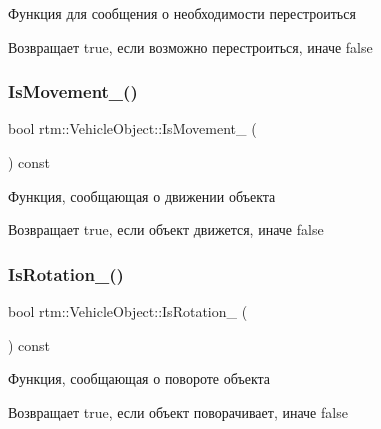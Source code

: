 Функция для сообщения о необходимости перестроиться 

\begin{DoxyReturn}{Возвращает}
true, если возможно перестроиться, иначе false 
\end{DoxyReturn}
\mbox{\label{classrtm_1_1_vehicle_object_adcccb796e4b1b404a25512fa8491cd43}} 
\subsubsection{\texorpdfstring{Is\+Movement\+\_\+()}{IsMovement\_()}}
{\footnotesize\ttfamily bool rtm\+::\+Vehicle\+Object\+::\+Is\+Movement\+\_\+ (\begin{DoxyParamCaption}{ }\end{DoxyParamCaption}) const\hspace{0.3cm}{\ttfamily [protected]}}



Функция, сообщающая о движении объекта 

\begin{DoxyReturn}{Возвращает}
true, если объект движется, иначе false 
\end{DoxyReturn}
\mbox{\label{classrtm_1_1_vehicle_object_a7cb07a20e09d1460ec3d2dd70d62aba2}} 
\subsubsection{\texorpdfstring{Is\+Rotation\+\_\+()}{IsRotation\_()}}
{\footnotesize\ttfamily bool rtm\+::\+Vehicle\+Object\+::\+Is\+Rotation\+\_\+ (\begin{DoxyParamCaption}{ }\end{DoxyParamCaption}) const\hspace{0.3cm}{\ttfamily [protected]}}



Функция, сообщающая о повороте объекта 

\begin{DoxyReturn}{Возвращает}
true, если объект поворачивает, иначе false 
\end{DoxyReturn}
\mbox{\label{classrtm_1_1_vehicle_object_a464c8de22beb3cbf819d12ad36ae4974}} 
